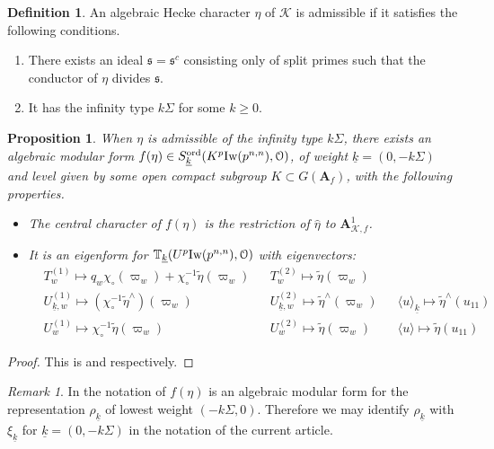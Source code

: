\documentclass[leqno]{amsart}
\newtheorem{prop}[thm]{Proposition}
\theoremstyle{definition}
\newtheorem{defn}[thm]{Definition}
\theoremstyle{remark}
\newtheorem{rem}[thm]{Remark}
\newcommand{\eo}{\EuScript{O}}
\newcommand{\A}{\mathbf A}
\newcommand{\fs}{\mathfrak{s}}
\newcommand{\K}{{\mathcal{K}}} %
\newcommand{\wt}[1]{\underline{ #1 }}
\newcommand{\Iw}{\textnormal{Iw}} %
\newcommand{\TT}{\mathbb{T}} %
\newcommand{\ord}{\textnormal{ord}} %
\begin{document}
\begin{defn}\label{def:admchar}
An algebraic Hecke character $\eta$ of $\K$ is admissible
if it satisfies the following conditions.
\begin{enumerate}
\item 
There exists an ideal $\fs=\fs^c$
consisting only of split primes such that 
the conductor of $\eta$ divides $\fs$.
\item 
It has the infinity type $k\Sigma$
for some $k\geq 0$.
\end{enumerate}
\end{defn}

\begin{prop}\label{prop:single}
When $\eta$ is admissible of the infinity type $k\Sigma$,
there exists an algebraic modular form
$f(\eta)\in S_{\wt{k}}^{\ord}(K^p\Iw(p^{n,n}),\eo)$,
of weight $\wt{k}=(0,-k\Sigma)$ and level given by
some open compact subgroup $K\subset G(\A_f)$,
with the following properties.
\begin{itemize}
\item The central character of $f(\eta)$
is the restriction of $\hat{\eta}$ to $\A_{\K,f}^1$.
\item  It is an eigenform for 
$\TT_{\wt{k}}(U^p\Iw(p^{n,n}),\eo)$ with eigenvectors:
\begin{align*}
&T_w^{(1)}\mapsto
q_w\chi_\circ(\varpi_w)+\chi_\circ^{-1}\tilde{\eta}(\varpi_w)&
&T_w^{(2)}\mapsto \tilde{\eta}(\varpi_w)\\
&U_{\wt{k},w}^{(1)}\mapsto
(\chi_\circ^{-1}\tilde{\eta}^\wedge)(\varpi_w)&
&U_{\wt{k},w}^{(2)}\mapsto
\tilde{\eta}^\wedge(\varpi_w)&
&\langle u\rangle_{\wt{k}}\mapsto
\tilde{\eta}^\wedge(u_{11})\\
&U_{w}^{(1)}\mapsto\chi_\circ^{-1}\tilde{\eta}(\varpi_w)&
&U_{w}^{(2)}\mapsto\tilde{\eta}(\varpi_w)&
&\langle u\rangle\mapsto \tilde{\eta}(u_{11})
\end{align*}
\end{itemize}
\end{prop}
\begin{proof}
    This is \cite[Prop. 6.6]{lee} and \cite[Prop. 6.7]{lee} 
    respectively.
\end{proof}


\begin{rem}
    In the notation of \cite{lee} $f(\eta)$ is an algebraic modular
    form for the representation $\rho_{\wt{k}}$ of 
    lowest weight $(-k\Sigma, 0)$. Therefore we may identify
    $\rho_{\wt{k}}$ with $\xi_{\wt{k}}$ for 
    $\wt{k}=(0, -k\Sigma)$ in the notation of the current article.
\end{rem}
\end{document}
